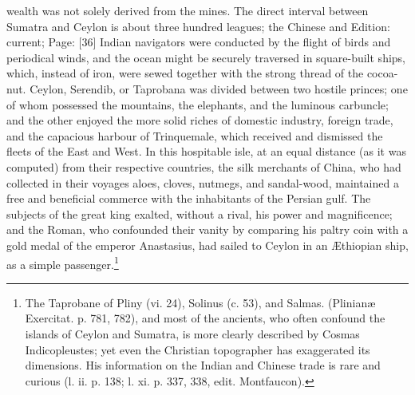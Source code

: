 wealth was not solely derived from the mines. The direct interval between Sumatra and Ceylon is about three hundred leagues; the Chinese and Edition: current; Page: [36] Indian navigators were conducted by the flight of birds and periodical winds, and the ocean might be securely traversed in square-built ships, which, instead of iron, were sewed together with the strong thread of the cocoa-nut. Ceylon, Serendib, or Taprobana was divided between two hostile princes; one of whom possessed the mountains, the elephants, and the luminous carbuncle; and the other enjoyed the more solid riches of domestic industry, foreign trade, and the capacious harbour of Trinquemale, which received and dismissed the fleets of the East and West. In this hospitable isle, at an equal distance (as it was computed) from their respective countries, the silk merchants of China, who had collected in their voyages aloes, cloves, nutmegs, and sandal-wood, maintained a free and beneficial commerce with the inhabitants of the Persian gulf. The subjects of the great king exalted, without a rival, his power and magnificence; and the Roman, who confounded their vanity by comparing his paltry coin with a gold medal of the emperor Anastasius, had sailed to Ceylon in an Æthiopian ship, as a simple passenger.\footnote{The Taprobane of Pliny (vi. 24), Solinus (c. 53), and Salmas. (Plinianæ Exercitat. p. 781, 782), and most of the ancients, who often confound the islands of Ceylon and Sumatra, is more clearly described by Cosmas Indicopleustes; yet even the Christian topographer has exaggerated its dimensions. His information on the Indian and Chinese trade is rare and curious (l. ii. p. 138; l. xi. p. 337, 338, edit. Montfaucon).}

